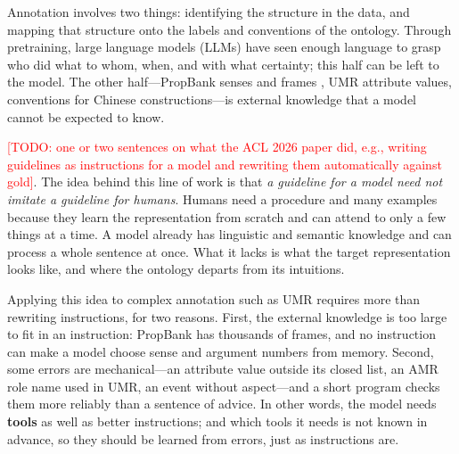 \documentclass[11pt]{article}
\newcommand{\umr}{\textsc{UMR}\xspace}
\newcommand{\amr}{\textsc{AMR}\xspace}
\newcommand{\todo}[1]{\textcolor{red}{[TODO: #1]}}
\begin{document}
Annotation involves two things: identifying the structure in the data, and mapping that structure onto the labels and conventions of the ontology. Through pretraining, large language models (LLMs) have seen enough language to grasp who did what to whom, when, and with what certainty; this half can be left to the model. The other half---PropBank senses and frames \citep{palmer2005propbank}, \umr attribute values, conventions for Chinese constructions---is external knowledge that a model cannot be expected to know.

\citet{acl2026base} \todo{one or two sentences on what the ACL 2026 paper did, e.g., writing guidelines as instructions for a model and rewriting them automatically against gold}. The idea behind this line of work is that \emph{a guideline for a model need not imitate a guideline for humans}. Humans need a procedure and many examples because they learn the representation from scratch and can attend to only a few things at a time. A model already has linguistic and semantic knowledge and can process a whole sentence at once. What it lacks is what the target representation looks like, and where the ontology departs from its intuitions.

Applying this idea to complex annotation such as \umr requires more than rewriting instructions, for two reasons. First, the external knowledge is too large to fit in an instruction: PropBank has thousands of frames, and no instruction can make a model choose sense and argument numbers from memory. Second, some errors are mechanical---an attribute value outside its closed list, an \amr role name used in \umr, an event without aspect---and a short program checks them more reliably than a sentence of advice. In other words, the model needs \textbf{tools} as well as better instructions; and which tools it needs is not known in advance, so they should be learned from errors, just as instructions are.
\end{document}
